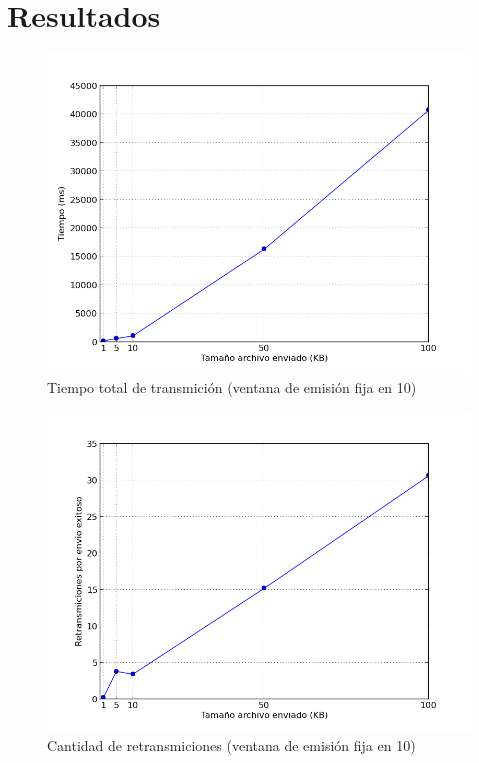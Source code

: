 \section{Resultados}

\begin{figure}[H]
\begin{center}
\includegraphics[width=\textwidth,keepaspectratio]{tiempos.png}
\end{center}
\caption{Tiempo total de transmición (ventana de emisión fija en 10)} \label{figura1}
\end{figure}


\begin{figure}[H]
\begin{center}
\includegraphics[width=\textwidth,keepaspectratio]{retransmiciones.png}
\end{center}
\caption{Cantidad de retransmiciones (ventana de emisión fija en 10)} \label{figura2}
\end{figure}


